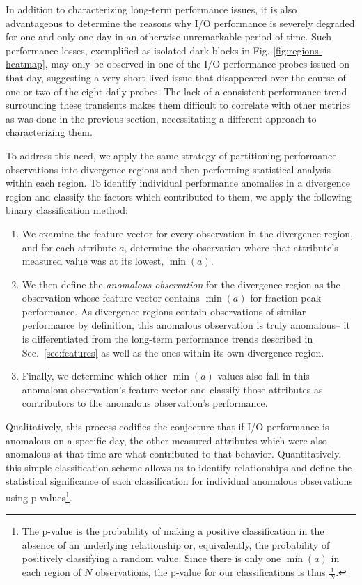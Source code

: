 In addition to characterizing long-term performance issues, it is also advantageous to determine the reasons why I/O performance is severely degraded for one and only one day in an otherwise unremarkable period of time.
Such performance losses, exemplified as isolated dark blocks in Fig. \ref{fig:regions-heatmap}, may only be observed in one of the I/O performance probes issued on that day, suggesting a very short-lived issue that disappeared over the course of one or two of the eight daily probes.
The lack of a consistent performance trend surrounding these transients makes them difficult to correlate with other metrics as was done in the previous section, necessitating a different approach to characterizing them.

To address this need, we apply the same strategy of partitioning performance observations into divergence regions and then performing statistical analysis within each region.
To identify individual performance anomalies in a divergence region and classify the factors which contributed to them, we apply the following binary classification method:

\begin{enumerate}[leftmargin=*]

\item We examine the feature vector for every observation in the divergence region, and for each attribute $a$, determine the observation where that attribute's measured value was at its lowest, $\min(a)$.

\item We then define the \emph{anomalous observation} for the divergence region as the observation whose feature vector contains $\min(a)$ for fraction peak performance.
As divergence regions contain observations of similar performance by definition, this anomalous observation is truly anomalous-- it is differentiated from the long-term performance trends described in Sec.~\ref{sec:features} as well as the ones within its own divergence region.

\item Finally, we determine which other $\min(a)$ values also fall in this anomalous observation's feature vector and classify those attributes as contributors to the anomalous observation's performance.

\end{enumerate}

Qualitatively, this process codifies the conjecture that if I/O performance is anomalous on a specific day, the other measured attributes which were also anomalous at that time are what contributed to that behavior.
Quantitatively, this simple classification scheme allows us to identify relationships and define the statistical significance of each classification for individual anomalous observations using p-values\footnote{
The p-value is the probability of making a positive classification in the absence of an underlying relationship or, equivalently, the probability of positively classifying a random value.
Since there is only one $\min(a)$ in each region of $N$ observations, the p-value for our classifications is thus $\frac{1}{N}.$}.

